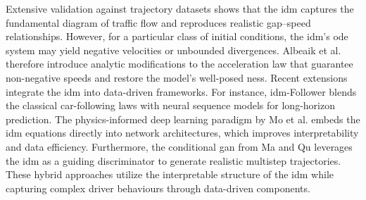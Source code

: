 \mynewline
Extensive validation against trajectory datasets shows that the \ac{idm} captures the fundamental diagram of traffic flow and reproduces realistic gap–speed relationships. \cite{Treiber_2000, Kesting_2008, TREIBER2013922} However, for a particular class of initial conditions, the \ac{idm}’s \ac{ode} system may yield negative velocities or unbounded divergences. Albeaik et al. \cite{Albeaik2022} therefore introduce analytic modifications to the acceleration law that guarantee non-negative speeds and restore the model’s well-posed ness.
Recent extensions integrate the \ac{idm} into data-driven frameworks. For instance, \ac{idm}-Follower blends the classical car-following laws with neural sequence models for long-horizon prediction. \cite{IDM_Wang2022} The physics-informed deep learning paradigm by Mo et al. \cite{Mo2020PIDL} embeds the \ac{idm} equations directly into network architectures, which improves interpretability and data efficiency. Furthermore, the conditional \ac{gan} from Ma and Qu \cite{MaQu2023} leverages the \ac{idm} as a guiding discriminator to generate realistic multistep trajectories. These hybrid approaches utilize the interpretable structure of the \ac{idm} while capturing complex driver behaviours through data-driven components.

